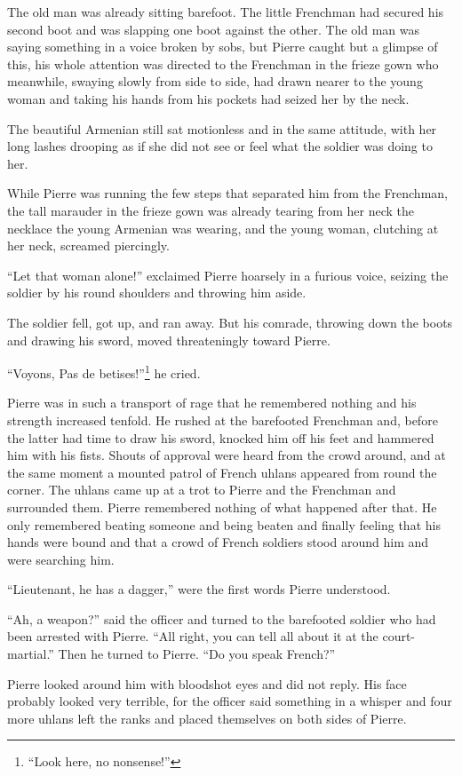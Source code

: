 The old man was already sitting barefoot. The little Frenchman
had secured his second boot and was slapping one boot against the
other. The old man was saying something in a voice broken by
sobs, but Pierre caught but a glimpse of this, his whole
attention was directed to the Frenchman in the frieze gown who
meanwhile, swaying slowly from side to side, had drawn nearer to
the young woman and taking his hands from his pockets had seized
her by the neck.

The beautiful Armenian still sat motionless and in the same
attitude, with her long lashes drooping as if she did not see or
feel what the soldier was doing to her.

While Pierre was running the few steps that separated him from
the Frenchman, the tall marauder in the frieze gown was already
tearing from her neck the necklace the young Armenian was
wearing, and the young woman, clutching at her neck, screamed
piercingly.

``Let that woman alone!'' exclaimed Pierre hoarsely in a furious
voice, seizing the soldier by his round shoulders and throwing
him aside.

The soldier fell, got up, and ran away. But his comrade, throwing
down the boots and drawing his sword, moved threateningly toward
Pierre.

``Voyons, Pas de betises!''\footnote{``Look here, no nonsense!''}
he cried.

Pierre was in such a transport of rage that he remembered nothing
and his strength increased tenfold. He rushed at the barefooted
Frenchman and, before the latter had time to draw his sword,
knocked him off his feet and hammered him with his fists. Shouts
of approval were heard from the crowd around, and at the same
moment a mounted patrol of French uhlans appeared from round the
corner. The uhlans came up at a trot to Pierre and the Frenchman
and surrounded them. Pierre remembered nothing of what happened
after that. He only remembered beating someone and being beaten
and finally feeling that his hands were bound and that a crowd of
French soldiers stood around him and were searching him.

``Lieutenant, he has a dagger,'' were the first words Pierre
understood.

``Ah, a weapon?'' said the officer and turned to the barefooted
soldier who had been arrested with Pierre. ``All right, you can
tell all about it at the court-martial.'' Then he turned to
Pierre. ``Do you speak French?''

Pierre looked around him with bloodshot eyes and did not
reply. His face probably looked very terrible, for the officer
said something in a whisper and four more uhlans left the ranks
and placed themselves on both sides of Pierre.

